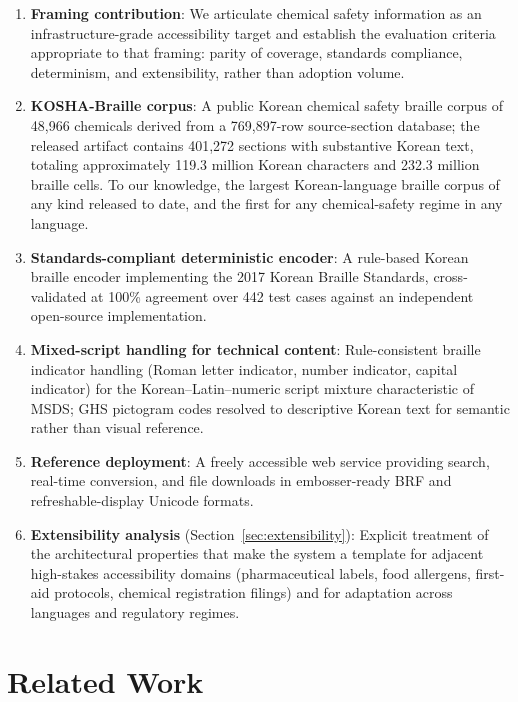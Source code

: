\documentclass[smallextended]{svjour3}
\begin{document}
\begin{enumerate}
\item \textbf{Framing contribution}: We articulate chemical safety information as an infrastructure-grade accessibility target and establish the evaluation criteria appropriate to that framing: parity of coverage, standards compliance, determinism, and extensibility, rather than adoption volume.

\item \textbf{KOSHA-Braille corpus}: A public Korean chemical safety braille corpus of 48,966 chemicals derived from a 769,897-row source-section database; the released artifact contains 401,272 sections with substantive Korean text, totaling approximately 119.3 million Korean characters and 232.3 million braille cells. To our knowledge, the largest Korean-language braille corpus of any kind released to date, and the first for any chemical-safety regime in any language.

\item \textbf{Standards-compliant deterministic encoder}: A rule-based Korean braille encoder implementing the 2017 Korean Braille Standards, cross-validated at 100\% agreement over 442 test cases against an independent open-source implementation.

\item \textbf{Mixed-script handling for technical content}: Rule-consistent braille indicator handling (Roman letter indicator, number indicator, capital indicator) for the Korean--Latin--numeric script mixture characteristic of MSDS; GHS pictogram codes resolved to descriptive Korean text for semantic rather than visual reference.

\item \textbf{Reference deployment}: A freely accessible web service providing search, real-time conversion, and file downloads in embosser-ready BRF and refreshable-display Unicode formats.

\item \textbf{Extensibility analysis} (Section~\ref{sec:extensibility}): Explicit treatment of the architectural properties that make the system a template for adjacent high-stakes accessibility domains (pharmaceutical labels, food allergens, first-aid protocols, chemical registration filings) and for adaptation across languages and regulatory regimes.
\end{enumerate}

\section{Related Work}
\label{sec:related}
\end{document}
